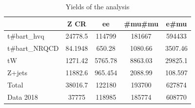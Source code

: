 \documentclass[10pt]{article}
\begin{document}
\begin{table}[htbp]
\begin{center}
\begin{tabular}{|l|S|S|S|S|}
\hline 
 & {Z CR} & {ee} & {#mu#mu} & {e#mu}\\
\hline 
  t#bar{t}_{hvq}   & 24778.5  & 114799  & 181667  & 594433  \\ 
  t#bar{t}_{NRQCD}   & 84.1948  & 650.28  & 1080.66  & 3507.46  \\ 
  tW   & 1271.42  & 5765.78  & 8863.03  & 29825.1  \\ 
  Z+jets   & 11882.6  & 965.454  & 2088.99  & 108.597  \\ 
\hline 
  Total  & 38016.7  & 122180  & 193700  & 627874  \\ 
\hline 
  Data 2018   & 37775 & 118985 & 185774 & 608770 \\ 
\hline 
\end{tabular} 
\caption{Yields of the analysis} 
\end{center} 
\end{table} 
\end{document}
